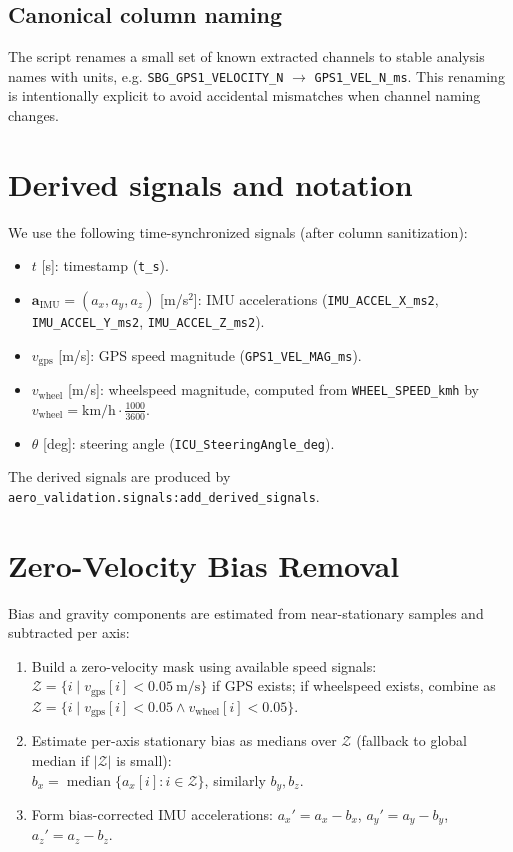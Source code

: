 \documentclass[11pt,a4paper]{article}
\begin{document}
\subsection*{Canonical column naming}
The script renames a small set of known extracted channels to stable analysis names with units,
e.g. \texttt{SBG\_GPS1\_VELOCITY\_N} $\rightarrow$ \texttt{GPS1\_VEL\_N\_ms}.
This renaming is intentionally explicit to avoid accidental mismatches when channel naming changes.

\section{Derived signals and notation}
We use the following time-synchronized signals (after column sanitization):
\begin{itemize}
  \item $t$ [s]: timestamp (\texttt{t\_s}).
  \item $\mathbf{a}_\text{IMU} = (a_x, a_y, a_z)$ [m/s$^2$]: IMU accelerations (\texttt{IMU\_ACCEL\_X\_ms2}, \texttt{IMU\_ACCEL\_Y\_ms2}, \texttt{IMU\_ACCEL\_Z\_ms2}).
  \item $v_\text{gps}$ [m/s]: GPS speed magnitude (\texttt{GPS1\_VEL\_MAG\_ms}).
  \item $v_\text{wheel}$ [m/s]: wheelspeed magnitude, computed from \texttt{WHEEL\_SPEED\_kmh} by $v_\text{wheel} = \text{km/h} \cdot \frac{1000}{3600}$.
  \item $\theta$ [deg]: steering angle (\texttt{ICU\_SteeringAngle\_deg}).
\end{itemize}

The derived signals are produced by \texttt{aero\_validation.signals:add\_derived\_signals}.

\section{Zero-Velocity Bias Removal}
Bias and gravity components are estimated from near-stationary samples and subtracted per axis:
\begin{enumerate}
  \item Build a zero-velocity mask using available speed signals:\\
  $\mathcal{Z} = \{ i \mid v_\text{gps}[i] < 0.05 ~\text{m/s} \}$ if GPS exists; if wheelspeed exists, combine as $\mathcal{Z} = \{ i \mid v_\text{gps}[i] < 0.05 \land v_\text{wheel}[i] < 0.05 \}$.
  \item Estimate per-axis stationary bias as medians over $\mathcal{Z}$ (fallback to global median if $|\mathcal{Z}|$ is small):\\
  $b_x = \operatorname{median}\{ a_x[i] : i \in \mathcal{Z} \}$, similarly $b_y, b_z$.
  \item Form bias-corrected IMU accelerations: $a_x' = a_x - b_x$, $a_y' = a_y - b_y$, $a_z' = a_z - b_z$.
\end{enumerate}
\end{document}
